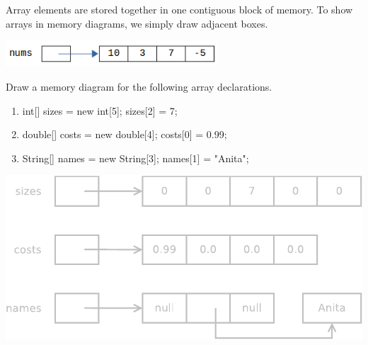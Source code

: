 
Array elements are stored together in one contiguous block of memory.
To show arrays in memory diagrams, we simply draw adjacent boxes.

\begin{center}

\vspace{1ex}
\includegraphics[width=225pt]{array-diagram1.png}
\end{center}




\Q Draw a memory diagram for the following array declarations.

\begin{minipage}{0.46\linewidth}

\begin{enumerate}

\item
\begin{javalst}
int[] sizes = new int[5];
sizes[2] = 7;
\end{javalst}

\item
\begin{javalst}
double[] costs = new double[4];
costs[0] = 0.99;
\end{javalst}

\item
\begin{javalst}
String[] names = new String[3];
names[1] = "Anita";
\end{javalst}

\end{enumerate}

\end{minipage}
\hfill
\begin{minipage}{0.53\linewidth}

\begin{answer}[130pt]
\includegraphics[width=\linewidth]{decl-array.pdf}
\end{answer}

\end{minipage}


